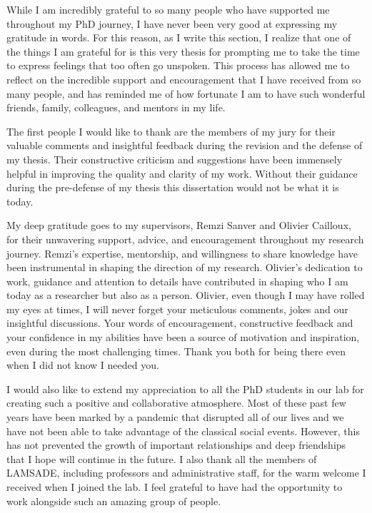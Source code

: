 While I am incredibly grateful to so many people who have supported me throughout my PhD journey, I have never been very good at expressing my gratitude in words. For this reason, as I write this section, I realize that one of the things I am grateful for is this very thesis for prompting me to take the time to express feelings that too often go unspoken. This process has allowed me to reflect on the incredible support and encouragement that I have received from so many people, and has reminded me of how fortunate I am to have such wonderful friends, family, colleagues, and mentors in my life.

The first people I would like to thank are the members of my jury for their valuable comments and insightful feedback during the revision and the defense of my thesis. Their constructive criticism and suggestions have been immensely helpful in improving the quality and clarity of my work. Without their guidance during the pre-defense of my thesis this dissertation would not be what it is today.

My deep gratitude goes to my supervisors, Remzi Sanver and Olivier Cailloux, for their unwavering support, advice, and encouragement throughout my research journey. Remzi’s expertise, mentorship, and willingness to share knowledge have been instrumental in shaping the direction of my research. Olivier’s dedication to work, guidance and attention to details have contributed in shaping who I am today as a researcher but also as a person. Olivier, even though I may have rolled my eyes at times, I will never forget your meticulous comments, jokes and our insightful discussions. Your words of encouragement, constructive feedback and your confidence in my abilities have been a source of motivation and inspiration, even during the most challenging times. Thank you both for being there even when I did not know I needed you.

I would also like to extend my appreciation to all the PhD students in our lab for creating such a positive and collaborative atmosphere. Most of these past few years have been marked by a pandemic that disrupted all of our lives and we have not been able to take advantage of the classical social events. However, this has not prevented the growth of important relationships and deep friendships that I hope will continue in the future. I also thank all the members of LAMSADE, including professors and administrative staff, for the warm welcome I received when I joined the lab. I feel grateful to have had the opportunity to work alongside such an amazing group of people.

